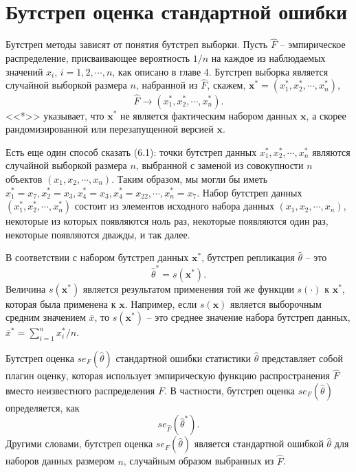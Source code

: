 \section{Бутстреп оценка стандартной ошибки}

Бутстреп методы зависят от понятия бутстреп выборки. Пусть $\hat F$ -- эмпирическое распределение, присваивающее вероятность $1 / n$ на каждое из наблюдаемых значений $x_i$, $i = 1, 2,\cdots, n$, как описано в главе 4. Бутстреп выборка является случайной выборкой размера $n$, набранной из $\hat F$, скажем, $\mathbf{x}^* = (x_1^*, x_2^*, \cdots, x_n^*)$,
\begin{equation}
    \hat F\rightarrow (x_1^*, x_2^*, \cdots, x_n^*).
\end{equation}
<<*>> указывает, что $\mathbf{x}^*$ не является фактическим набором данных $\mathbf{x}$, а скорее рандомизированной или перезапущенной версией $\mathbf{x}$.

Есть еще один способ сказать (6.1): точки бутстреп данных $x_1^*, x_2^*, \cdots, x_n^*$ являются случайной выборкой размера $n$, выбранной с заменой из совокупности $n$ объектов $(x_1, x_2, \cdots, x_n )$. Таким образом, мы могли бы иметь $x_1^* = x_7, x_2^* = x_3, x_4^* = x_3, x_4^* = x_{22},\cdots, x_n^* = x_7$. Набор бутстреп данных $(x_1^*, x_2^*, \cdots, x_n^*)$ состоит из элементов исходного набора данных $(x_1, x_2,\cdots, x_n)$, некоторые из которых появляются ноль раз, некоторые появляются один раз, некоторые появляются дважды, и так далее.

В соответствии с набором бутстреп данных $\mathbf{x}^*$, бутстреп репликация $\hat\theta$ -- это
\begin{equation}
    \hat\theta^*=s(\mathbf{x}^*).
\end{equation}
Величина $s(\mathbf{x}^*)$ является результатом применения той же функции $s (\cdot)$ к $\mathbf{x}^*$, которая была применена к $\mathbf{x}$. Например, если $s(\mathbf{x})$ является выборочным средним значением $\bar x$, то $s(\mathbf{x}^*)$ -- это среднее значение набора бутстреп данных, $\bar x^*=\sum_{i=1}^nx_i^*/n$. 

Бутстреп оценка $se_F (\hat\theta)$ стандартной ошибки статистики $\hat\theta$ представляет собой плагин оценку, которая использует эмпирическую функцию распространения $\hat F$ вместо неизвестного распределения $F$. В частности, бутстреп оценка  $se_F (\hat\theta)$ определяется, как 
\begin{equation}
    se_{\hat F} (\hat\theta^*).
\end{equation}
Другими словами, бутстреп оценка $se_F (\hat\theta)$ является стандартной ошибкой $\hat\theta$ для наборов данных размером $n$, случайным образом выбранных из $\hat F$. 

